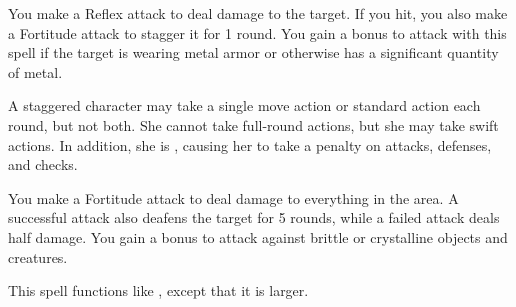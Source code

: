 \begin{spelleffect}
    You make a Reflex attack to deal damage to the target. If you hit, you also make a Fortitude attack to stagger it for 1 round. You gain a  bonus to attack with this spell if the target is wearing metal armor or otherwise has a significant quantity of metal.
\end{spelleffect}
\begin{spellnotes}
   A staggered character may take a single move action or standard action each round, but not both. She cannot take full-round actions, but she may take swift actions. In addition, she is \vulnerable, causing her to take a  penalty on attacks, defenses, and checks.
\end{spellnotes}

\begin{spelleffect}
    You make a Fortitude attack to deal damage to everything in the area. A successful attack also deafens the target for 5 rounds, while a failed attack deals half damage. You gain a  bonus to attack against brittle or crystalline objects and creatures.
\end{spelleffect}

\begin{spelleffect}
  This spell functions like , except that it is larger.
\end{spelleffect}

